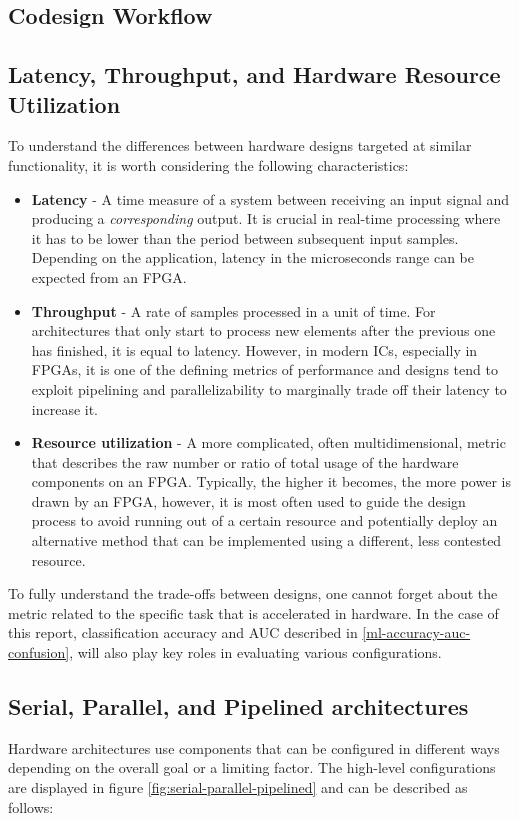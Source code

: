 \subsection{\hlsml Codesign Workflow}



\subsection{Latency, Throughput, and Hardware Resource Utilization}\label{latency-throughput-resources}
To understand the differences between hardware designs targeted at similar functionality, it is worth considering the following characteristics:

\begin{itemize}
  \item \textbf{Latency} - A time measure of a system between receiving an input signal and producing a \textit{corresponding} output. It is crucial in real-time processing where it has to be lower than the period between subsequent input samples. Depending on the application, latency in the microseconds range can be expected from an FPGA.
  \item \textbf{Throughput} - A rate of samples processed in a unit of time. For architectures that only start to process new elements after the previous one has finished, it is equal to latency. However, in modern ICs, especially in FPGAs, it is one of the defining metrics of performance and designs tend to exploit pipelining and parallelizability to marginally trade off their latency to increase it.
  \item \textbf{Resource utilization} - A more complicated, often multidimensional, metric that describes the raw number or ratio of total usage of the hardware components on an FPGA. Typically, the higher it becomes, the more power is drawn by an FPGA, however, it is most often used to guide the design process to avoid running out of a certain resource and potentially deploy an alternative method that can be implemented using a different, less contested resource.
\end{itemize}

To fully understand the trade-offs between designs, one cannot forget about the metric related to the specific task that is accelerated in hardware. In the case of this report, classification accuracy and AUC described in \autoref{ml-accuracy-auc-confusion}, will also play key roles in evaluating various configurations.


\subsection{Serial, Parallel, and Pipelined architectures}\label{serial-parallel-pipelined}
Hardware architectures use components that can be configured in different ways depending on the overall goal or a limiting factor. The high-level configurations  are displayed in figure \ref{fig:serial-parallel-pipelined} and can be described as follows:

